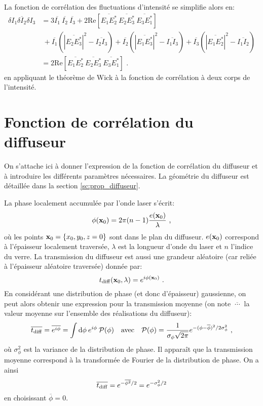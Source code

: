 La fonction de corrélation des fluctuations d'intensité se simplifie alors en:
\begin{align}
\overline{\delta I_1 \delta I_2 \delta I_3} &= 3 \overline{I_1}\: \overline{I_2}\: \overline{I_3} + 2\mathrm{Re}\left[ \overline{E_1 E^*_2} \: \overline{E_2 E^*_3} \: \overline{E_3 E^*_1}\right]\\
\nonumber & \: + \overline{I_1} \left( \left|\overline{E_2 E^*_3} \right|^2 -\overline{I_2 I_3}\right) + \overline{I_2} \left( \left|\overline{E_1 E^*_3}\right|^2 - \overline{I_1 I_3}\right)+ \overline{I_3} \left(\left|\overline{E_1 E^*_2}\right|^2 -\overline{I_1 I_2}\right) \\
&= 2\mathrm{Re}\left[ \overline{E_1 E^*_2} \: \overline{E_2 E^*_3} \: \overline{E_3 E^*_1}\right] \text{ .}
\label{eq:wick_3corps}
\end{align}
en appliquant le théorème de Wick à la fonction de corrélation à deux corps de l'intensité.








\section{Fonction de corrélation du diffuseur}
On s'attache ici à donner l'expression de la fonction de corrélation du diffuseur et à introduire les différents paramètres nécessaires. La géométrie du diffuseur est détaillée dans la section \ref{sc:prop_diffuseur}.

La phase localement accumulée par l'onde laser s'écrit:
\begin{equation}
\phi(\mathbf{x}_0)=2\pi (n-1) \frac{e(\mathbf{x}_0)}{\lambda} \text{ ,}
\end{equation}
où les points $\mathbf{x}_0=\lbrace x_0, y_0, z=0\rbrace$ sont dans le plan du diffuseur. $e(\mathbf{x}_0)$ correspond à l'épaisseur localement traversée, $\lambda$ est la longueur d'onde du laser et $n$ l'indice du verre. La transmission du diffuseur est aussi une grandeur aléatoire (car reliée à l'épaisseur aléatoire traversée) donnée par:
\begin{equation}
t_{\mathrm{diff}}(\mathbf{x}_0,\lambda)=e^{i \phi(\mathbf{x}_0)} \text{ .}
\end{equation}
En considérant une distribution de phase (et donc d'épaisseur) gaussienne, on peut alors obtenir une expression pour la transmission moyenne (on note $\overline{\:\cdots\:}$ la valeur moyenne sur l'ensemble des réalisations du diffuseur):
\begin{equation}
\overline{t_{\mathrm{diff}}}= \overline{e^{i \phi}} = \int{ \mathrm{d}\phi \: e^{i \phi} \: \mathcal{P}(\phi)} \quad \text{avec} \quad \mathcal{P}(\phi) = \frac{1}{\sigma_{\phi} \sqrt{2 \pi}} e^{-(\phi - \overline{\phi})^2 /2 \sigma_{\phi}^2} \text{ ,}
\end{equation}
où $\sigma_{\phi}^2$ est la variance de la distribution de phase. Il apparaît que la transmission moyenne correspond à la transformée de Fourier de la distribution de phase. On a ainsi
\begin{equation}
\overline{t_{\mathrm{diff}}} = e^{-\overline{\phi^2}/2} = e^{-\sigma_{\phi}^2/2}
\end{equation}
en choisissant $\overline{\phi}=0$. 

